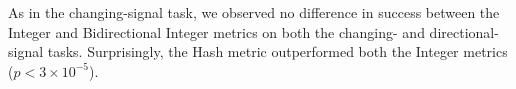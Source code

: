 As in the changing-signal task, we observed no difference in success between the Integer and Bidirectional Integer metrics on both the changing- and directional-signal tasks.
Surprisingly, the Hash metric outperformed both the Integer metrics ($p < 3\times10^{-5}$).





